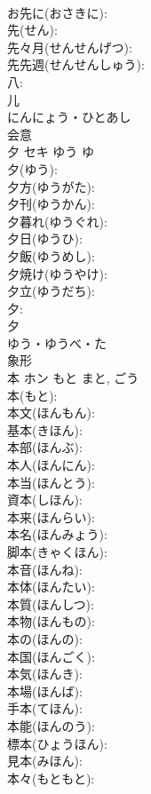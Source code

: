 \documentclass[8pt]{extreport}
\begin{document}
\begin{CJK}{UTF8}{min}
\\	お先に(おさきに): 
\\	先(せん): 
\\	先々月(せんせんげつ): 
\\	先先週(せんせんしゅう): 
\\	八: 
\\	儿	
\\	にんにょう・ひとあし	
\\	会意 
\\	夕	セキ	ゆう	ゆ	
\\	夕(ゆう): 
\\	夕方(ゆうがた): 
\\	夕刊(ゆうかん): 
\\	夕暮れ(ゆうぐれ): 
\\	夕日(ゆうひ): 
\\	夕飯(ゆうめし): 
\\	夕焼け(ゆうやけ): 
\\	夕立(ゆうだち): 
\\	夕: 
\\	夕	
\\	ゆう・ゆうべ・た	
\\	象形 
\\	本	ホン	もと	まと, ごう	
\\	本(もと): 
\\	本文(ほんもん): 
\\	基本(きほん): 
\\	本部(ほんぶ): 
\\	本人(ほんにん): 
\\	本当(ほんとう): 
\\	資本(しほん): 
\\	本来(ほんらい): 
\\	本名(ほんみょう): 
\\	脚本(きゃくほん): 
\\	本音(ほんね): 
\\	本体(ほんたい): 
\\	本質(ほんしつ): 
\\	本物(ほんもの): 
\\	本の(ほんの): 
\\	本国(ほんごく): 
\\	本気(ほんき): 
\\	本場(ほんば): 
\\	手本(てほん): 
\\	本能(ほんのう): 
\\	標本(ひょうほん): 
\\	見本(みほん): 
\\	本々(もともと): 

\end{CJK}
\end{document}

